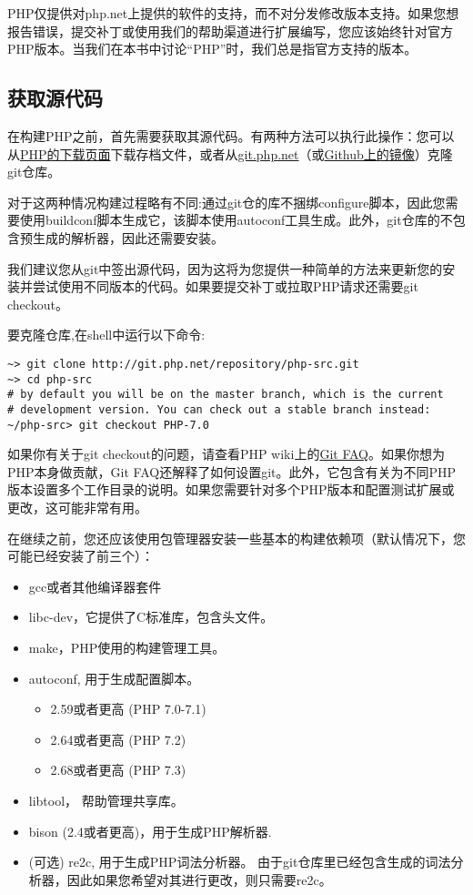 PHP仅提供对php.net上提供的软件的支持，而不对分发修改版本支持。如果您想报告错误，提交补丁或使用我们的帮助渠道进行扩展编写，您应该始终针对官方PHP版本。当我们在本书中讨论“PHP”时，我们总是指官方支持的版本。

\subsection{获取源代码}

在构建PHP之前，首先需要获取其源代码。有两种方法可以执行此操作：您可以从\href{http://www.php.net/downloads.php}{PHP的下载页面}下载存档文件，或者从\href{http://git.php.net/}{git.php.net}（或\href{http://www.github.com/php/php-src}{Github上的镜像}）克隆git仓库。

对于这两种情况构建过程略有不同:通过git仓的库不捆绑configure脚本，因此您需要使用buildconf脚本生成它，该脚本使用autoconf工具生成。此外，git仓库的不包含预生成的解析器，因此还需要安装。

我们建议您从git中签出源代码，因为这将为您提供一种简单的方法来更新您的安装并尝试使用不同版本的代码。如果要提交补丁或拉取PHP请求还需要git checkout。

要克隆仓库,在shell中运行以下命令:

\begin{lstlisting}[language=shell]
~> git clone http://git.php.net/repository/php-src.git
~> cd php-src
# by default you will be on the master branch, which is the current
# development version. You can check out a stable branch instead:
~/php-src> git checkout PHP-7.0
\end{lstlisting}

如果你有关于git checkout的问题，请查看PHP wiki上的\href{https://wiki.php.net/vcs/gitfaq}{Git FAQ}。如果你想为PHP本身做贡献，Git FAQ还解释了如何设置git。此外，它包含有关为不同PHP版本设置多个工作目录的说明。如果您需要针对多个PHP版本和配置测试扩展或更改，这可能非常有用。

在继续之前，您还应该使用包管理器安装一些基本的构建依赖项（默认情况下，您可能已经安装了前三个）：

\begin{itemize}
    \item gcc或者其他编译器套件
    \item libc-dev，它提供了C标准库，包含头文件。
    \item make，PHP使用的构建管理工具。
    \item autoconf, 用于生成配置脚本。
    \begin{itemize}
        \item 2.59或者更高 (PHP 7.0-7.1)
        \item 2.64或者更高 (PHP 7.2)
        \item 2.68或者更高 (PHP 7.3)
    \end{itemize}
    \item libtool， 帮助管理共享库。
    \item bison (2.4或者更高)，用于生成PHP解析器.
    \item (可选) re2c, 用于生成PHP词法分析器。 由于git仓库里已经包含生成的词法分析器，因此如果您希望对其进行更改，则只需要re2c。
\end{itemize}

